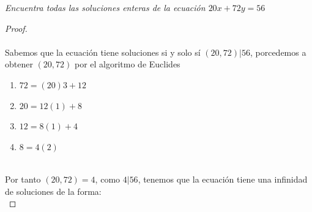 \documentclass[11pt,letterpaper]{article}
\begin{document}
\begin{tcolorbox}[
	title = \textcolor{black}{\textcolor{white}{Problema 8}},]
\textit{
Encuentra todas las soluciones enteras de la ecuaci\'on $20x+72y=56$ 
}
\end{tcolorbox}
\begin{proof}\,\\
    \,\\
    Sabemos que la ecuaci\'on tiene soluciones si y solo s\'i $(20,72)|56$, porcedemos a obtener
     $(20,72)$ por el algoritmo de Euclides\,\\
     \begin{enumerate}
        \item $72=(20)3+12$
        \item $20=12(1)+8$
        \item $12=8(1)+4$
        \item $8=4(2)$
     \end{enumerate}\,\\
     Por tanto $(20,72)=4$, como $4|56$, tenemos que la ecuaci\'on tiene una infinidad de soluciones
     de la forma:\,\\


\end{proof}
\end{document}

